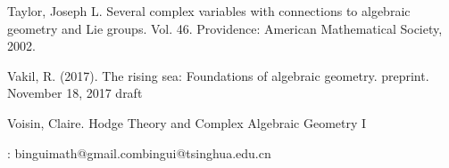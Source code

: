 \documentclass[12pt,b5paper,notitlepage]{report}
\theoremstyle{definition}
\theoremstyle{plain}
\numberwithin{equation}{section}
\begin{document}
\begin{thebibliography}{999999}





Taylor, Joseph L. Several complex variables with connections to algebraic geometry and Lie groups. Vol. 46. Providence: American Mathematical Society, 2002.




Vakil, R. (2017). The rising sea: Foundations of algebraic geometry. preprint. November 18, 2017 draft
		


Voisin, Claire. Hodge Theory and Complex Algebraic Geometry I


		
\end{thebibliography}


: binguimath@gmail.com\qquad bingui@tsinghua.edu.cn
\end{document}
